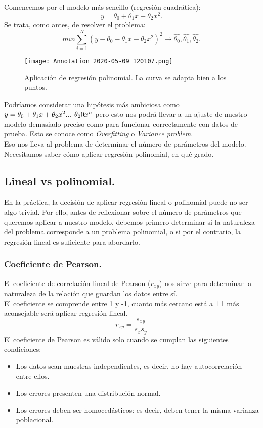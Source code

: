 \documentclass[a4paper,11pt]{article}
\begin{document}
\noindent
Comencemos por el modelo más sencillo (regresión cuadrática):
\begin{equation}
 y=\theta_0+\theta_1 x+\theta_2 x^2.
\end{equation}
Se trata, como antes, de resolver el problema:
\[
 min\sum_{i=1}^{N}(y-\theta_0-\theta_1 x-\theta_2 x^2)^2\longrightarrow \hat{\theta_0},\hat{\theta_1},\hat{\theta_2}.
\] 
\begin{figure}[H]
\centering
\texttt{[image: Annotation 2020-05-09 120107.png]}
\caption{Aplicación de regresión polinomial. La curva se adapta bien a los puntos.}
\end{figure}
\noindent
Podríamos considerar una hipótesis más ambiciosa como $y=\theta_0+\theta_1 x+\theta_2 x^2 ...\hspace{0.15cm} \theta_20 x^n$ pero esto nos podrá llevar a un ajuste de nuestro modelo demasiado preciso como para funcionar correctamente con datos de prueba. Esto se conoce como \textit{Overfitting} o \textit{Variance problem}.\\

\noindent
Eso nos lleva al problema de determinar el número de parámetros del modelo. Necesitamos saber cómo aplicar regresión polinomial, en qué grado.
\subsection{Lineal vs polinomial.}

En la práctica, la decisión de aplicar regresión lineal o polinomial puede no ser algo trivial. Por ello, antes de reflexionar sobre el número de parámetros que queremos aplicar a nuestro modelo, debemos primero determinar si la naturaleza del problema corresponde a un problema polinomial, o si por el contrario, la regresión lineal es suficiente para abordarlo.
\subsubsection{Coeficiente de Pearson.}

El coeficiente de correlación lineal de Pearson ($r_{xy}$) nos sirve para determinar la naturaleza de la relación que guardan los datos entre sí. \\

\noindent
El coeficiente se comprende entre 1 y -1, cuanto más cercano está a ±1 más aconsejable será aplicar regresión lineal.
\begin{equation}
r_{xy}=\frac{s_{xy}}{s_x s_y}
\end{equation}
El coeficiente de Pearson es válido solo cuando se cumplan las siguientes condiciones:
\begin{itemize}
    \item Los datos sean muestras independientes, es decir, no hay autocorrelación entre ellos.
    \item Los errores presenten una distribución normal.
    \item Los errores deben ser homocedásticos: es decir, deben tener la misma
varianza poblacional.
\end{itemize}
\end{document}
